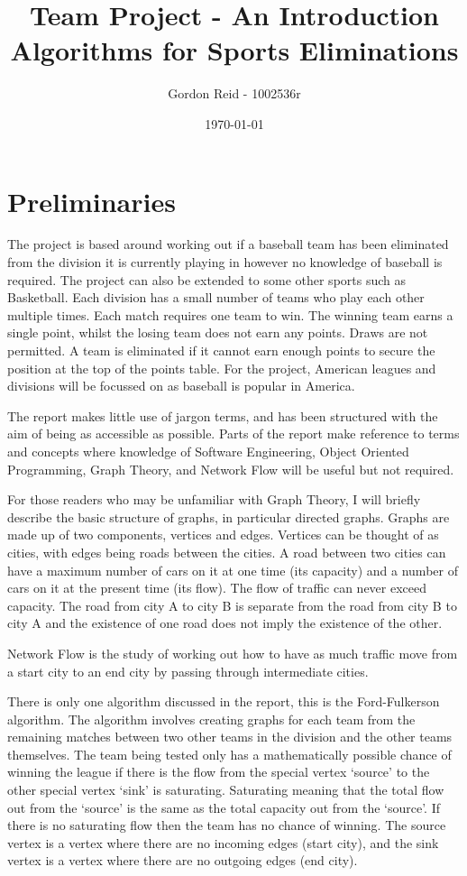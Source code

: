 \documentclass[11pt]{article}
\title{Team Project - An Introduction\\Algorithms for Sports Eliminations}
\author{Gordon Reid - 1002536r}
\date{\today}
\begin{document}
\maketitle

\section*{Preliminaries}

The project is based around working out if a baseball team has been eliminated
from the division it is currently playing in however no knowledge of baseball
is required. The project can also be extended to some other sports such as 
Basketball. Each division has a small number of teams who play each other 
multiple times. Each match requires one team to win. The winning team earns a 
single point, whilst the losing team does not earn any points. Draws are not
permitted. A team is eliminated if it cannot earn enough points to secure the 
position at the top of the points table. For the project, American leagues
and divisions will be focussed on as baseball is popular in America.

The report makes little use of jargon terms, and has been structured with the
aim of being as accessible as possible. Parts of the report make reference to
terms and concepts where knowledge of Software Engineering, Object Oriented
Programming, Graph Theory, and Network Flow will be useful but not required.

For those readers who may be unfamiliar with Graph Theory, I will briefly
describe the basic structure of graphs, in particular directed graphs.
Graphs are made up of two components, vertices and edges. Vertices can be
thought of as cities, with edges being roads between the cities. A road between
two cities can have a maximum number of cars on it at one time (its capacity)
and a number of cars on it at the present time (its flow). The flow of traffic
can never exceed capacity. The road from city A to city B is separate from the 
road from city B to city A and the existence of one road does not imply the 
existence of the other.

Network Flow is the study of working out how to have as much traffic move
from a start city to an end city by passing through intermediate cities.

There is only one algorithm discussed in the report, this is the Ford-Fulkerson
algorithm. The algorithm involves creating graphs for each team from the 
remaining matches between two other teams in the division and the other teams 
themselves. The team being tested only has a mathematically possible chance of 
winning the league if there is the flow from the special vertex `source' to the 
other special vertex `sink' is saturating. Saturating meaning that the total 
flow out from the `source' is the same as the total capacity out from the 
`source'. If there is no saturating flow then the team has no chance of 
winning. The source vertex is a vertex where there are no incoming edges (start 
city), and the sink vertex is a vertex where there are no outgoing edges (end 
city).
\end{document}
